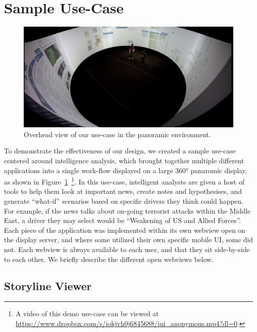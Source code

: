 \section{Sample Use-Case}

\begin{figure}
\centering
  \includegraphics[width=0.8\columnwidth]{chapters/04_muifold/figures/demo_360.png}
  \caption{Overhead view of our use-case in the panoramic environment.}
  \label{fig:application_usecase}
\end{figure}

To demonstrate the effectiveness of our design, we created a sample
use-case centered around intelligence analysis, which brought together
multiple different applications into a single work-flow displayed
on a large 360° panaromic display, as shown in Figure~\ref{fig:application_usecase}~\footnote{A video of this demo 
use-case can be viewed at \url{https://www.dropbox.com/s/iokjvh0j6845688/iui_anonymous.mp4?dl=0}.}.
In this use-case, intelligent analysts are given a host of tools
to help them look at important news, create notes and hypothesises,
and generate ``what-if'' scenarios based on specific drivers they 
think could happen. For example, if the news talks about on-going
terrorist attacks within the Middle East, a driver they may select
would be ``Weakening of US and Allied Forces''.
Each piece of the application was implemented within its own webview 
open on the display server, and
where some utilized their own specific mobile UI, some did not. Each webview is always available to each user, and that they sit side-by-side to each other. We
briefly describe the different open webviews below. 

\subsection{Storyline Viewer}

